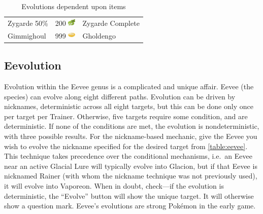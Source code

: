 \begin{table}
\begin{tabular}{lll}
    Zygarde 50\% & 200 \includegraphics[width=1em,height=1em]{images/zygardecell.png} & Zygarde Complete \\
    Gimmighoul & 999 \includegraphics[width=1em,height=1em]{images/gcoin.png} & Gholdengo \\
  \end{tabular}
\caption{Evolutions dependent upon items}
\label{table:itemevolutions}
\end{table}

\subsection{Eevolution}
\begin{figure}
\end{figure}
Evolution within the Eevee genus is a complicated and unique affair.
Eevee (the species) can evolve along eight different paths.
Evolution can be driven by nicknames, deterministic across all eight targets,
  but this can be done only once per target per Trainer.
Otherwise, five targets require some condition, and are deterministic.
If none of the conditions are met, the evolution is nondeterministic,
  with three possible results.
For the nickname-based mechanic, give the Eevee you wish to evolve the nickname
  specified for the desired target from \autoref{table:eevee}.
This technique takes precedence over the conditional mechanisms, i.e.\ an
  Eevee near an active Glacial Lure will typically evolve into Glacion,
  but if that Eevee is nicknamed Rainer (with whom the nickname technique
  was not previously used), it will evolve into Vaporeon.
When in doubt, check---if the evolution is deterministic, the ``Evolve'' button
  will show the unique target.
It will otherwise show a question mark.
Eevee's evolutions are strong Pokémon in the early game.
